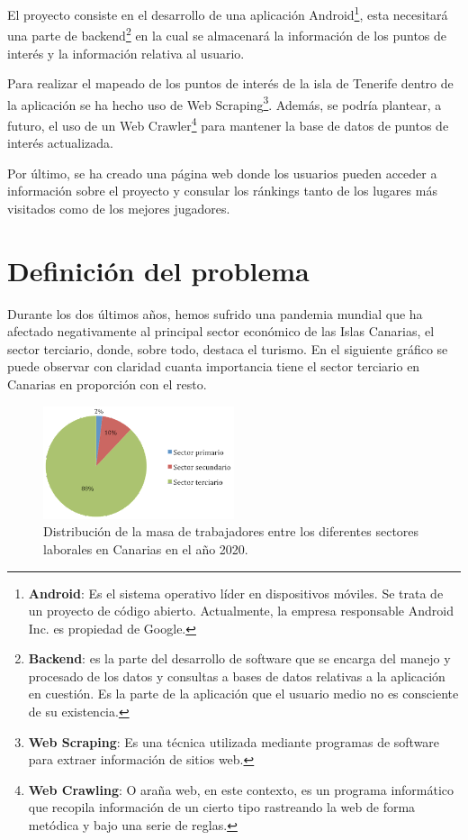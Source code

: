 
El proyecto consiste en el desarrollo de una aplicación Android\footnote{\textbf{Android}: Es el sistema operativo líder en dispositivos móviles. Se trata de un proyecto de código abierto. Actualmente, la empresa responsable Android Inc. es propiedad de Google.}, esta necesitará una parte de backend\footnote{\textbf{Backend}: es la parte del desarrollo de software que se encarga del manejo y procesado de los datos y consultas a bases de datos relativas a la aplicación en cuestión. Es la parte de la aplicación que el usuario medio no es consciente de su existencia.} en la cual se almacenará la información de los puntos de interés y la información relativa al usuario.

Para realizar el mapeado de los puntos de interés de la isla de Tenerife dentro de la aplicación se ha hecho uso de Web Scraping\footnote{\textbf{Web Scraping}: Es una técnica utilizada mediante programas de software para extraer información de sitios web.}. Además, se podría plantear, a futuro, el uso de un Web Crawler\footnote{\textbf{Web Crawling}: O araña web, en este contexto, es un programa informático que recopila información de un cierto tipo rastreando la web de forma metódica y bajo una serie de reglas.} para mantener la base de datos de puntos de interés actualizada.

Por último, se ha creado una página web donde los usuarios pueden acceder a información sobre el proyecto y consular los ránkings tanto de los lugares más visitados como de los mejores jugadores.

\section{Definición del problema}

Durante los dos últimos años, hemos sufrido una pandemia mundial que ha afectado negativamente al principal sector económico de las Islas Canarias, el sector terciario, donde, sobre todo, destaca el turismo. En el siguiente gráfico se puede observar con claridad cuanta importancia tiene el sector terciario en Canarias en proporción con el resto.

\begin{figure}[H]
    \centering
    \includegraphics[width=0.5\textwidth]{Memoria_TFG_LaTeX/images/sectoresEconomicosCanarias.png}
    \caption{Distribución de la masa de trabajadores entre los diferentes sectores laborales en Canarias en el año 2020\cite{sectoresEconomicosCanarias}.}
    \label{fig:sectoresCanarias}
\end{figure}

